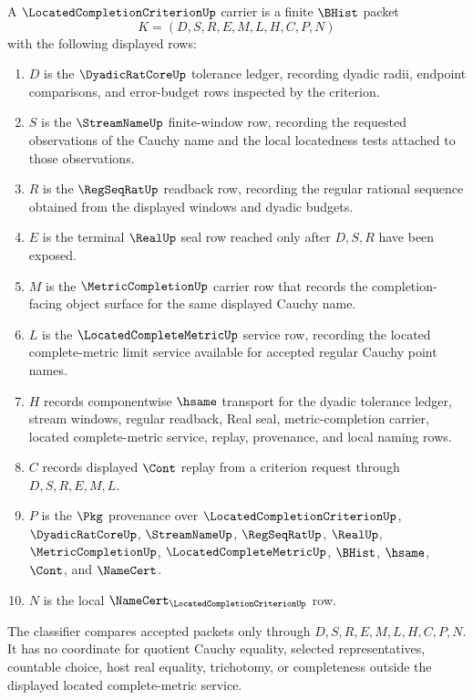 \begin{definition}
\label{def:located-completion-criterion-carrier}
A $\LocatedCompletionCriterionUp$ carrier is a finite $\BHist$ packet
$$
K=(D,S,R,E,M,L,H,C,P,N)
$$
with the following displayed rows:
\begin{enumerate}
\item $D$ is the $\DyadicRatCoreUp$ tolerance ledger, recording dyadic radii, endpoint comparisons, and error-budget rows inspected by the criterion.
\item $S$ is the $\StreamNameUp$ finite-window row, recording the requested observations of the Cauchy name and the local locatedness tests attached to those observations.
\item $R$ is the $\RegSeqRatUp$ readback row, recording the regular rational sequence obtained from the displayed windows and dyadic budgets.
\item $E$ is the terminal $\RealUp$ seal row reached only after $D,S,R$ have been exposed.
\item $M$ is the $\MetricCompletionUp$ carrier row that records the completion-facing object surface for the same displayed Cauchy name.
\item $L$ is the $\LocatedCompleteMetricUp$ service row, recording the located complete-metric limit service available for accepted regular Cauchy point names.
\item $H$ records componentwise $\hsame$ transport for the dyadic tolerance ledger, stream windows, regular readback, Real seal, metric-completion carrier, located complete-metric service, replay, provenance, and local naming rows.
\item $C$ records displayed $\Cont$ replay from a criterion request through $D,S,R,E,M,L$.
\item $P$ is the $\Pkg$ provenance over $\LocatedCompletionCriterionUp$, $\DyadicRatCoreUp$, $\StreamNameUp$, $\RegSeqRatUp$, $\RealUp$, $\MetricCompletionUp$, $\LocatedCompleteMetricUp$, $\BHist$, $\hsame$, $\Cont$, and $\NameCert$.
\item $N$ is the local $\NameCert_{\LocatedCompletionCriterionUp}$ row.
\end{enumerate}
The classifier compares accepted packets only through $D,S,R,E,M,L,H,C,P,N$. It has no coordinate for quotient Cauchy equality, selected representatives, countable choice, host real equality, trichotomy, or completeness outside the displayed located complete-metric service.
\end{definition}

